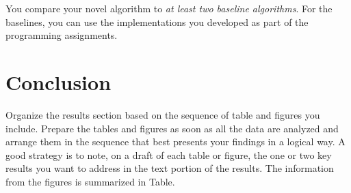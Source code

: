 \documentclass[10pt,conference,compsocconf]{IEEEtran}
\begin{document}
    You compare your novel algorithm to \emph{at least two baseline
    algorithms}. For the baselines, you can use the implementations you
    developed as part of the programming assignments.


    \section{Conclusion}

    Organize the results section based on the sequence of table and
    figures you include. Prepare the tables and figures as soon as all
    the data are analyzed and arrange them in the sequence that best
    presents your findings in a logical way. A good strategy is to note,
    on a draft of each table or figure, the one or two key results you
    want to address in the text portion of the results.
    The information from the figures is
    summarized in Table.




    
    
\end{document}
